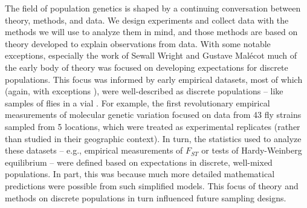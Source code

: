 \documentclass{ar-1col}
\begin{document}
The field of population genetics is shaped by a continuing conversation
between theory, methods, and data.
We design experiments and collect data
with the methods we will use to analyze them in mind, 
and those methods are based on theory
developed to explain observations from data.
With some notable exceptions,
especially the work of Sewall Wright \citep{Wright1940,Wright1943,wright1946isolation}
and Gustave Mal\'ecot \citep{malecot}
much of the early body of theory was focused on
developing expectations for discrete populations.
This focus was informed by early empirical datasets,
most of which
(again, with exceptions \citet[e.g.,][]{Dobzhansky_Wright1943, dobzhansky1947}),
were well-described as discrete populations --
like samples of flies in a vial \citep{lewontin1974}.
For example, 
the first revolutionary empirical measurements
of molecular genetic variation \citep{HubbyLewontin66,LewontinHubby66}
focused on data from 43 fly strains sampled from 5 locations,
which were treated as experimental replicates
(rather than studied in their geographic context).
In turn, 
the statistics used to analyze these datasets --
e.g., empirical measurements of $F_{ST}$ \citep{Wright1951}
or tests of Hardy-Weinberg equilibrium \citep{hardy1908,weinberg1908} --
were defined based on expectations in discrete, well-mixed populations.
In part, this was because much more detailed mathematical predictions 
were possible from such simplified models.
This focus of theory and methods on discrete populations in turn influenced
future sampling designs.
\end{document}
